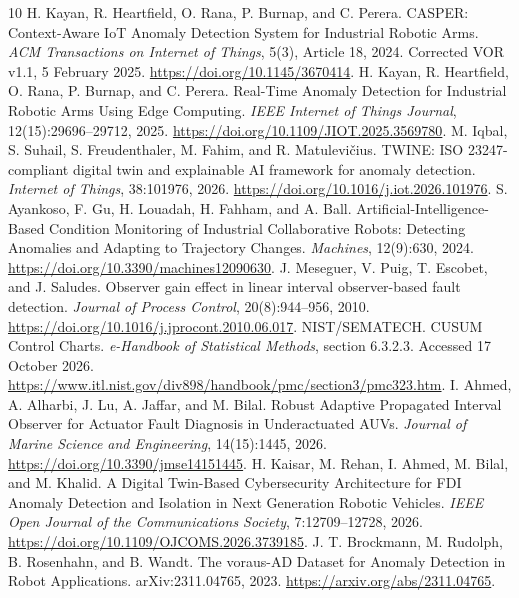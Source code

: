 \begin{thebibliography}{10}
 H. Kayan, R. Heartfield, O. Rana, P. Burnap, and C. Perera. CASPER: Context-Aware IoT Anomaly Detection System for Industrial Robotic Arms. \emph{ACM Transactions on Internet of Things}, 5(3), Article 18, 2024. Corrected VOR v1.1, 5 February 2025. \url{https://doi.org/10.1145/3670414}.
 H. Kayan, R. Heartfield, O. Rana, P. Burnap, and C. Perera. Real-Time Anomaly Detection for Industrial Robotic Arms Using Edge Computing. \emph{IEEE Internet of Things Journal}, 12(15):29696--29712, 2025. \url{https://doi.org/10.1109/JIOT.2025.3569780}.
 M. Iqbal, S. Suhail, S. Freudenthaler, M. Fahim, and R. Matulevičius. TWINE: ISO 23247-compliant digital twin and explainable AI framework for anomaly detection. \emph{Internet of Things}, 38:101976, 2026. \url{https://doi.org/10.1016/j.iot.2026.101976}.
 S. Ayankoso, F. Gu, H. Louadah, H. Fahham, and A. Ball. Artificial-Intelligence-Based Condition Monitoring of Industrial Collaborative Robots: Detecting Anomalies and Adapting to Trajectory Changes. \emph{Machines}, 12(9):630, 2024. \url{https://doi.org/10.3390/machines12090630}.
 J. Meseguer, V. Puig, T. Escobet, and J. Saludes. Observer gain effect in linear interval observer-based fault detection. \emph{Journal of Process Control}, 20(8):944--956, 2010. \url{https://doi.org/10.1016/j.jprocont.2010.06.017}.
 NIST/SEMATECH. CUSUM Control Charts. \emph{e-Handbook of Statistical Methods}, section 6.3.2.3. Accessed 17 October 2026. \url{https://www.itl.nist.gov/div898/handbook/pmc/section3/pmc323.htm}.
 I. Ahmed, A. Alharbi, J. Lu, A. Jaffar, and M. Bilal. Robust Adaptive Propagated Interval Observer for Actuator Fault Diagnosis in Underactuated AUVs. \emph{Journal of Marine Science and Engineering}, 14(15):1445, 2026. \url{https://doi.org/10.3390/jmse14151445}.
 H. Kaisar, M. Rehan, I. Ahmed, M. Bilal, and M. Khalid. A Digital Twin-Based Cybersecurity Architecture for FDI Anomaly Detection and Isolation in Next Generation Robotic Vehicles. \emph{IEEE Open Journal of the Communications Society}, 7:12709--12728, 2026. \url{https://doi.org/10.1109/OJCOMS.2026.3739185}.
 J. T. Brockmann, M. Rudolph, B. Rosenhahn, and B. Wandt. The voraus-AD Dataset for Anomaly Detection in Robot Applications. arXiv:2311.04765, 2023. \url{https://arxiv.org/abs/2311.04765}.
\end{thebibliography}
